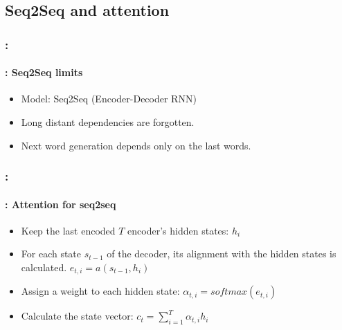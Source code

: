 \documentclass[xcolor=table]{beamer}
\begin{document}
\begin{frame}
	\frametitle{\insertshortsubtitle}
	\framesubtitle{\insertsection}
	
	
\end{frame}

\subsection{Seq2Seq and attention}

\begin{frame}
	\frametitle{\insertshortsubtitle: \insertsection}
	\framesubtitle{\insertsubsection: Seq2Seq limits}
	
	\begin{center}
	\end{center}
	
	\begin{itemize}
		\item Model: Seq2Seq (Encoder-Decoder RNN)
		\item Long distant dependencies are forgotten.
		\item Next word generation depends only on the last words.
	\end{itemize}
	
\end{frame}

\begin{frame}
	\frametitle{\insertshortsubtitle: \insertsection}
	\framesubtitle{\insertsubsection: Attention for seq2seq}
	
	\begin{center}
	\end{center}
	
	\vskip-6pt
	\begin{itemize}
		\item Keep the last encoded $T$ encoder's hidden states: $h_i$
		\item For each state $s_{t-1}$ of the decoder, its alignment with the hidden states is calculated.
		$ e_{t, i} = a(s_{t-1}, h_i) $
		\item Assign a weight to each hidden state: $\alpha_{t, i} = softmax(e_{t, i})$
		\item Calculate the state vector: $c_t = \sum_{i=1}^{T} \alpha_{t, i} h_i$
	\end{itemize}
	
\end{frame}
\end{document}
